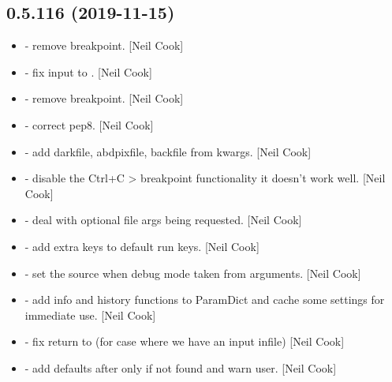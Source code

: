 \documentclass[a4paper,10pt,english]{report}
\begin{document}
\subsection{0.5.116 (2019-11-15)}
\label{\detokenize{misc/changelog:id27}}\begin{itemize}
\item {} 
 - remove breakpoint. {[}Neil Cook{]}

\item {} 
 - fix input to . {[}Neil Cook{]}

\item {} 
 - remove breakpoint. {[}Neil Cook{]}

\item {} 
 - correct pep8. {[}Neil Cook{]}

\item {} 
 - add darkfile, abdpixfile, backfile from
kwargs. {[}Neil Cook{]}

\item {} 
 - disable the Ctrl+C \textendash{}\textgreater{} breakpoint
functionality it doesn’t work well. {[}Neil Cook{]}

\item {} 
 - deal with optional file args
being requested. {[}Neil Cook{]}

\item {} 
 - add extra keys to default run
keys. {[}Neil Cook{]}

\item {} 
 - set the source when debug mode taken from
arguments. {[}Neil Cook{]}

\item {} 
 - add info and history functions to
ParamDict and cache some settings for immediate use. {[}Neil Cook{]}

\item {} 
 - fix return to 
(for case where we have an input infile) {[}Neil Cook{]}

\item {} 
 - add defaults after only if not
found and warn user. {[}Neil Cook{]}


\end{itemize}
\end{document}
